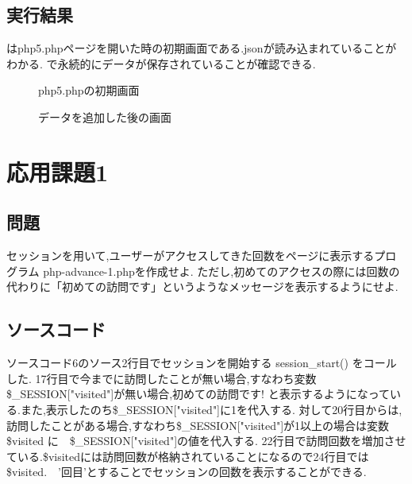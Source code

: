 \documentclass[a4j,10pt]{jsarticle}
\begin{document}
\subsection{実行結果}

はphp5.phpページを開いた時の初期画面である.jsonが読み込まれていることがわかる.
で永続的にデータが保存されていることが確認できる.

\begin{figure}[H]
  \centering
  \caption{php5.phpの初期画面}
\label{fig:fig9}
\end{figure}

\begin{figure}[H]
  \centering
  \caption{データを追加した後の画面}
\label{fig:fig10}
\end{figure}



\newpage

\section{応用課題1}

\subsection{問題}

  セッションを用いて,ユーザーがアクセスしてきた回数をページに表示するプログラム
  php-advance-1.phpを作成せよ.
  ただし,初めてのアクセスの際には回数の代わりに「初めての訪問です」というようなメッセージを表示するようにせよ.

\subsection{ソースコード}

ソースコード6のソース2行目でセッションを開始する session\_start() をコールした.
17行目で今までに訪問したことが無い場合,すなわち変数\$\_SESSION["visited"]が無い場合,初めての訪問です! と表示するようになっている.また,表示したのち\$\_SESSION["visited"]に1を代入する.
対して20行目からは,訪問したことがある場合,すなわち\$\_SESSION["visited"]が1以上の場合は変数 \$visited に　\$\_SESSION["visited"]の値を代入する.
22行目で訪問回数を増加させている.\$visitedには訪問回数が格納されていることになるので24行目では \$visited.　'回目'とすることでセッションの回数を表示することができる.
\end{document}

